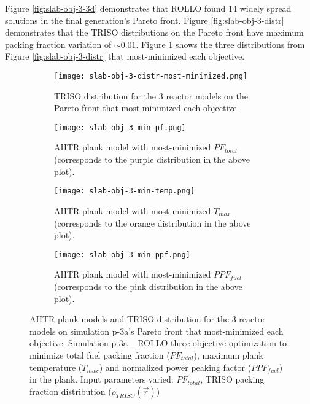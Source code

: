Figure \ref{fig:slab-obj-3-3d} demonstrates that \gls{ROLLO} found 14 widely spread 
solutions in the final generation's Pareto front. 
Figure \ref{fig:slab-obj-3-distr} demonstrates that the TRISO distributions on the
Pareto front have maximum packing fraction variation of $\sim0.01$. 
Figure \ref{fig:slab-obj-3-distr-most-minimized} shows the three distributions from 
Figure \ref{fig:slab-obj-3-distr} that most-minimized each objective. 
\begin{figure}[htbp!]
    \centering
    \begin{subfigure}{\textwidth}
        \texttt{[image: slab-obj-3-distr-most-minimized.png]}
        \caption{TRISO distribution for the 3 reactor models on the Pareto front
        that most minimized each objective.}
        \label{fig:slab-obj-3-distr-most-minimized}
    \end{subfigure}
    \begin{subfigure}{0.8\textwidth}
        \texttt{[image: slab-obj-3-min-pf.png]}
        \caption{\gls{AHTR} plank model with most-minimized $PF_{total}$ 
        (corresponds to the purple distribution in the above plot).}
        \label{fig:slab-obj-3-min-pf} 
    \end{subfigure}
    \begin{subfigure}{0.8\textwidth}
        \texttt{[image: slab-obj-3-min-temp.png]}
        \caption{\gls{AHTR} plank model with most-minimized $T_{max}$
        (corresponds to the orange distribution in the above plot).}
        \label{fig:slab-obj-3-min-temp} 
    \end{subfigure}
    \begin{subfigure}{0.8\textwidth}
        \texttt{[image: slab-obj-3-min-ppf.png]}
        \caption{\gls{AHTR} plank model with most-minimized $PPF_{fuel}$
        (corresponds to the pink distribution in the above plot).}
        \label{fig:slab-obj-3-min-ppf} 
    \end{subfigure}
    \caption{AHTR plank models and TRISO distribution for the 3 reactor models on simulation 
    p-3a's Pareto front that most-minimized each objective.
    Simulation p-3a -- ROLLO three-objective optimization to minimize total fuel packing 
    fraction ($PF_{total}$), maximum plank temperature ($T_{max}$) and 
    normalized power peaking factor ($PPF_{fuel}$) in the plank. 
    Input parameters varied: $PF_{total}$, TRISO packing fraction distribution
    ($\rho_{TRISO}(\vec{r})$)}
    \label{fig:slab-obj-3-most-minimized}
\end{figure}

